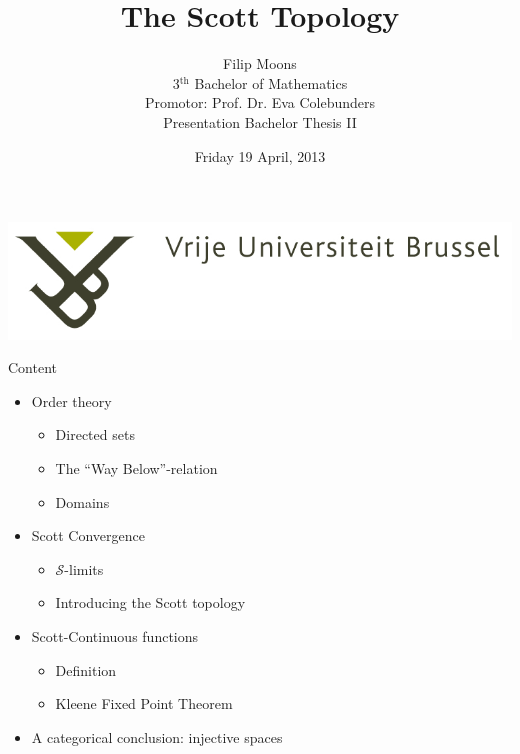 \documentclass{beamer}
\title{The Scott Topology}
\author{Filip Moons\\3$^{\text{th}}$ Bachelor of Mathematics\\Promotor: Prof. Dr. Eva Colebunders\\Presentation Bachelor Thesis II}
\date{Friday 19 April, 2013}
\begin{document}
\begin{frame}[plain]
\includegraphics[width=0.4\paperwidth]{VUB_logo.jpg}
\vspace{2cm}
\titlepage
\end{frame}



%
%
%
%

\begin{frame}{Content}
\begin{itemize}
  \item Order theory
    \begin{itemize}
        \item Directed sets
        \item The ``Way Below''-relation
        \item Domains
    \end{itemize}
  \item Scott Convergence
    \begin{itemize}
        \item $\mathcal{S}$-limits
        \item Introducing the Scott topology
    \end{itemize}

  \item Scott-Continuous functions
   \begin{itemize}
        \item Definition
        \item Kleene Fixed Point Theorem
    \end{itemize}
  \item A categorical conclusion: injective spaces
\end{itemize}

\end{frame}
\end{document}
